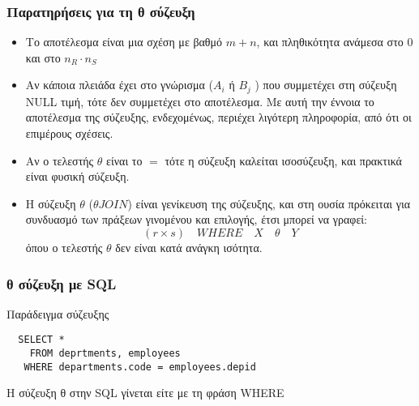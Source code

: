 \begin{frame}
\frametitle{Παρατηρήσεις για τη θ σύζευξη}
\begin{itemize}
  \item Το αποτέλεσμα είναι μια σχέση με βαθμό $m+n$,
        και πληθικότητα ανάμεσα στο 0 και στο $n_R \cdot n_S$
  \item Αν κάποια πλειάδα έχει στο γνώρισμα ($A_i$ ή $B_j$ ) που συμμετέχει
στη σύζευξη {\sq NULL} τιμή, τότε δεν συμμετέχει στο αποτέλεσμα.
Με αυτή την έννοια το αποτέλεσμα της σύζευξης,
ενδεχομένως, περιέχει λιγότερη πληροφορία, από ότι οι επιμέρους σχέσεις.
  \item Αν ο τελεστής $\theta$ είναι το $=$ τότε η σύζευξη καλείται ισοσύζευξη,
        και πρακτικά είναι φυσική σύζευξη.
  \item Η σύζευξη $\theta$ ($\theta JOIN$) είναι γενίκευση της σύζευξης,
       και στη ουσία πρόκειται για συνδυασμό των πράξεων γινομένου και επιλογής,
       έτσι μπορεί να γραφεί: \\
       \[ (r \times s) \quad WHERE \quad X \quad \theta \quad Y \]
       όπου ο τελεστής $\theta$ δεν είναι κατά ανάγκη ισότητα.
\end{itemize}
\end{frame}



\begin{frame}[fragile]
\frametitle{θ σύζευξη με {\sq SQL}}
\begin{block}{Παράδειγμα σύζευξης} \en
\begin{lstlisting}
  SELECT *
    FROM deprtments, employees
   WHERE departments.code = employees.depid
\end{lstlisting}
\el
Η σύζευξη θ στην {\sq SQL} γίνεται είτε με τη φράση {\sq WHERE}
\end{block}
\end{frame}

